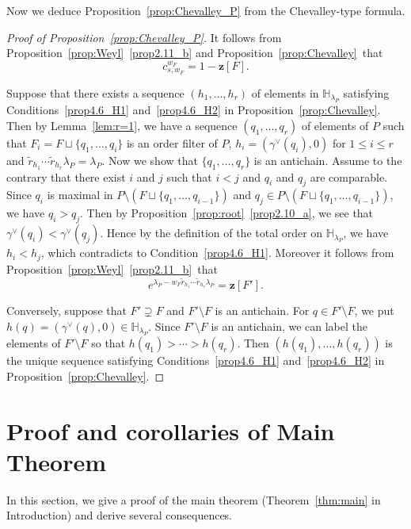 \documentclass[ALCO,ThmDefs,Unicode,epreuves]{cedram}
\newcommand\vectz{\boldsymbol{z}}
\renewcommand\tilde{\widetilde}
\begin{document}
Now we deduce Proposition~\ref{prop:Chevalley_P} from the Chevalley-type formula.

\begin{proof}[Proof of Proposition~\ref{prop:Chevalley_P}]
It follows from Proposition~\ref{prop:Weyl}~\ref{prop2.11_b}
and Proposition~\ref{prop:Chevalley}~that
$$
c^{w_F}_{s, w_F} = 1 - \vectz[F].
$$

Suppose that there exists a sequence $(h_1, \ldots, h_r)$ of elements in $\mathbb{H}_{\lambda_P}$ 
satisfying Conditions~\ref{prop4.6_H1} and~\ref{prop4.6_H2} in Proposition~\ref{prop:Chevalley}.
Then by Lemma~\ref{lem:r=1}, we have a sequence $(q_1, \ldots, q_r)$ of elements of $P$ such that 
$F_i = F \sqcup \{ q_1, \ldots, q_i \}$ is an order filter of $P$, $h_i = (\gamma^\vee(q_i),0)$ 
for $1 \le i \le r$ and $\tilde{r}_{h_1} \cdots \tilde{r}_{h_r} \lambda_P = \lambda_P$.
Now we show that $\{ q_1, \ldots, q_r \}$ is an antichain.
Assume to the contrary that there exist $i$ and $j$ such that $i<j$ and $q_i$ and $q_j$ are comparable.
Since $q_i$ is maximal in $P \setminus (F \sqcup \{ q_1, \ldots, q_{i-1} \})$ 
and $q_j \in P \setminus (F \sqcup \{ q_1, \ldots, q_{i-1} \})$, 
we have $q_i > q_j$.
Then by Proposition~\ref{prop:root}~\ref{prop2.10_a}, we see that $\gamma^\vee(q_i) < \gamma^\vee(q_j)$.
Hence by the definition of the total order on $\mathbb{H}_{\lambda_P}$, we have $h_i < h_j$,
which contradicts to Condition~\ref{prop4.6_H1}.
Moreover it follows from Proposition~\ref{prop:Weyl}~\ref{prop2.11_b}~that
$$
e^{\lambda_P - w_F \tilde{r}_{h_1} \cdots \tilde{r}_{h_r} \lambda_P}
 = \vectz[F'].
$$

Conversely, suppose that $F' \supsetneq F$ and $F' \setminus F$ is an antichain.
For $q \in F' \setminus F$, we put $h(q) = (\gamma^\vee(q),0) \in \mathbb{H}_{\lambda_P}$.
Since $F' \setminus F$ is an antichain, we can label the elements of $F' \setminus F$ 
so that $h(q_1) > \cdots > h(q_r)$.
Then $(h(q_1), \ldots, h(q_r))$ is the unique sequence satisfying Conditions~\ref{prop4.6_H1} and~\ref{prop4.6_H2} 
in Proposition~\ref{prop:Chevalley}.
\end{proof}


\section{%
Proof and corollaries of Main Theorem
}\label{sect5}

In this section, we give a proof of the main theorem (Theorem~\ref{thm:main} in Introduction) 
and derive several consequences.
\end{document}
